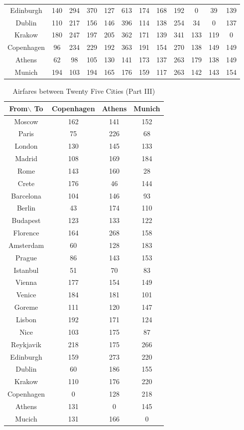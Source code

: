 \documentclass[12pt]{article}
\begin{document}
\begin{landscape}
\begin{table}[h]
\begin{tabular}{c|c|c|c|c|c|c|c|c|c|c|c}
Edinburgh & 140 & 294 & 370 & 127 & 613 & 174 & 168 & 192 & 0 & 39 & 139 \\
Dublin & 110 & 217 & 156 & 146 & 396 & 114 & 138 & 254 & 34 & 0 & 137 \\
Krakow & 180 & 247 & 197 & 205 & 362 & 171 & 139 & 341 & 133 & 119 & 0 \\
Copenhagen & 96 & 234 & 229 & 192 & 363 & 191 & 154 & 270 & 138 & 149 & 149 \\
Athens & 62 & 98 & 105 & 130 & 141 & 173 & 137 & 263 & 179 & 138 & 149 \\
Munich & 194 & 103 & 194 & 165 & 176 & 159 & 117 & 263 & 142 & 143 & 154 \\
\end{tabular}
\end{table}
\end{landscape}

\pagebreak

\begin{table}[h]
\caption{Airfares between Twenty Five Cities (Part III)}
\centering
\vspace{1mm}
\begin{tabular}{c|c|c|c}
\hline
\rule{0pt}{2ex} From$\backslash$ To & Copenhagen & Athens & Munich  \\
\hline
\rule{0pt}{2ex}Moscow &  162 & 141 & 152 \\
Paris & 75 & 226 & 68 \\
London & 130 & 145 & 133 \\
Madrid & 108 & 169 & 184 \\
Rome & 143 & 160 & 28 \\
Crete & 176 & 46 & 144 \\
Barcelona & 104 & 146 & 93 \\
Berlin & 43 & 174 & 110 \\
Budapest & 123 & 133 & 122 \\
Florence & 164 & 268 & 158 \\
Amsterdam & 60 & 128 & 183 \\
Prague & 86 & 143 & 153 \\
Istanbul & 51 & 70 & 83 \\
Vienna & 177 & 154 & 149 \\
Venice & 184 & 181 & 101 \\
Goreme & 111 & 120 & 147 \\
Lisbon & 192 & 171 & 124 \\
Nice & 103 & 175 & 87 \\
Reykjavik & 218 & 175 & 266 \\
Edinburgh & 159 & 273 & 220 \\
Dublin & 60 & 186 & 155 \\
Krakow & 110 & 176 & 220 \\
Copenhagen & 0 & 128 & 218 \\
Athens & 131 & 0 & 145 \\
Mucich & 131 & 166 & 0 \\
\end{tabular}
\end{table}
\pagebreak
\end{document}
